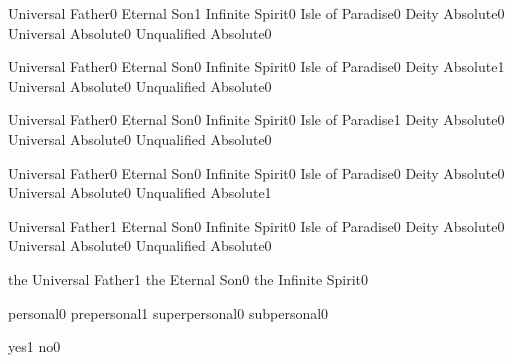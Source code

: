 {Universal Father}{0}
{Eternal Son}{1}
{Infinite Spirit}{0}
{Isle of Paradise}{0}
{Deity Absolute}{0}
{Universal Absolute}{0}
{Unqualified Absolute}{0}
\qstop

{Universal Father}{0}
{Eternal Son}{0}
{Infinite Spirit}{0}
{Isle of Paradise}{0}
{Deity Absolute}{1}
{Universal Absolute}{0}
{Unqualified Absolute}{0}
\qstop

{Universal Father}{0}
{Eternal Son}{0}
{Infinite Spirit}{0}
{Isle of Paradise}{1}
{Deity Absolute}{0}
{Universal Absolute}{0}
{Unqualified Absolute}{0}
\qstop

{Universal Father}{0}
{Eternal Son}{0}
{Infinite Spirit}{0}
{Isle of Paradise}{0}
{Deity Absolute}{0}
{Universal Absolute}{0}
{Unqualified Absolute}{1}
\qstop

{Universal Father}{1}
{Eternal Son}{0}
{Infinite Spirit}{0}
{Isle of Paradise}{0}
{Deity Absolute}{0}
{Universal Absolute}{0}
{Unqualified Absolute}{0}
\qstop

{the Universal Father}{1}
{the Eternal Son}{0}
{the Infinite Spirit}{0}
\qstop

{personal}{0}
{prepersonal}{1}
{superpersonal}{0}
{subpersonal}{0}
\qstop

{yes}{1}
{no}{0}
\qstop


